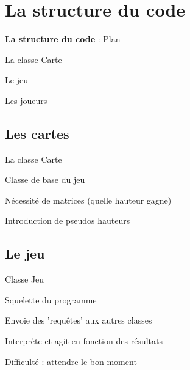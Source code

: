 \documentclass[c,12pt]{beamer}
\begin{document}
\section{La structure du code}
\begin{frame}{\textbf{La structure du code} : Plan}
\begin{itemize}
	 {\item La classe Carte }
	\newline
	 {\item Le jeu }
	\newline
	 {\item Les joueurs }
\end{itemize}
\end{frame}
	\subsection{Les cartes}
\begin{frame}{La classe Carte}
\begin{itemize}
	 {\item Classe de base du jeu}
	\newline
	 {\item Nécessité de matrices (quelle hauteur gagne)}
	\newline
	 {\item Introduction de pseudos hauteurs}
\end{itemize}
\end{frame}
	
	\subsection{Le jeu}
\begin{frame}{Classe Jeu}
\begin{itemize}
	 {\item Squelette du programme}
	\newline
	 {\item Envoie des 'requêtes' aux autres classes}
	\newline
	 {\item Interprète et agit en fonction des résultats}
	\newline
	 {\item Difficulté : attendre le bon moment}
\end{itemize}
\end{frame}
\end{document}
